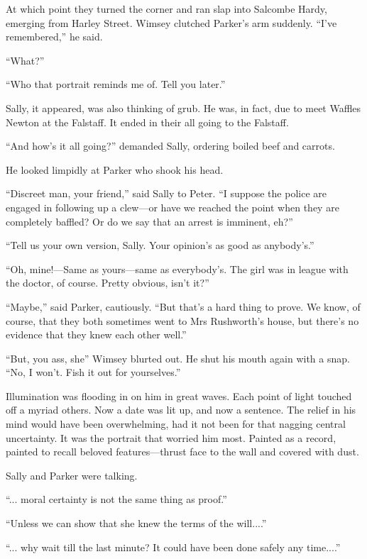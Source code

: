 At which point they turned the corner and ran slap into Salcombe Hardy, emerging from Harley Street. Wimsey clutched Parker's arm suddenly. \enquote{I've remembered,} he said.

\enquote{What?}

\enquote{Who that portrait reminds me of. Tell you later.}

Sally, it appeared, was also thinking of grub. He was, in fact, due to meet Waffles Newton at the Falstaff. It ended in their all going to the Falstaff.

\enquote{And how's it all going?} demanded Sally, ordering boiled beef and carrots.

He looked limpidly at Parker who shook his head.

\enquote{Discreet man, your friend,} said Sally to Peter. \enquote{I suppose the police are engaged in following up a clew\allowbreak---\allowbreak or have we reached the point when they are completely baffled? Or do we say that an arrest is imminent, eh?}

\enquote{Tell us your own version, Sally. Your opinion's as good as anybody's.}

\enquote{Oh, mine!---Same as yours\allowbreak---\allowbreak same as everybody's. The girl was in league with the doctor, of course. Pretty obvious, isn't it?}

\enquote{Maybe,} said Parker, cautiously. \enquote{But that's a hard thing to prove. We know, of course, that they both sometimes went to Mrs Rushworth's house, but there's no evidence that they knew each other well.}

\enquote{But, you ass, she\longdash} Wimsey blurted out. He shut his mouth again with a snap. \enquote{No, I won't. Fish it out for yourselves.}

Illumination was flooding in on him in great waves. Each point of light touched off a myriad others. Now a date was lit up, and now a sentence. The relief in his mind would have been overwhelming, had it not been for that nagging central uncertainty. It was the portrait that worried him most. Painted as a record, painted to recall beloved features\allowbreak---\allowbreak thrust face to the wall and covered with dust.

Sally and Parker were talking.

\enquote{... moral certainty is not the same thing as proof.}

\enquote{Unless we can show that she knew the terms of the will....}

\enquote{... why wait till the last minute? It could have been done safely any time....}

